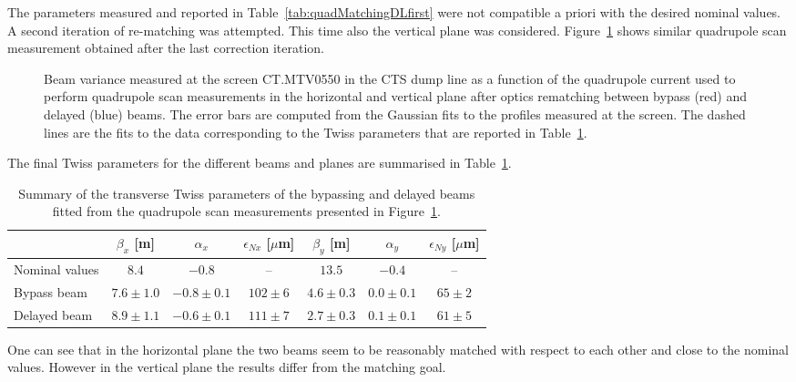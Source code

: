 The parameters measured and reported in Table~\ref{tab:quadMatchingDLfirst} were not compatible a
priori with the desired nominal values.
A second iteration of re-matching was attempted. This time also the vertical plane was considered.
Figure~\ref{fig:trasverseDLmatchingFinal} shows similar quadrupole scan measurement obtained after the
last correction iteration.
%
\begin{figure}[hbp]
\centering
{}
\qquad
{}
\caption{Beam variance measured at the screen CT.MTV0550 in the CTS dump line as a function of the
         quadrupole current used to perform quadrupole scan measurements 
         in the horizontal \protect{} and vertical
         \protect{} plane after optics rematching between bypass
         (red) and delayed (blue) beams.
         The error bars are computed from the Gaussian fits to the profiles measured at the screen.
         The dashed lines are the fits to the data corresponding to the Twiss parameters that are
         reported in Table~\ref{tab:quadMatchingDL}.
}
\label{fig:trasverseDLmatchingFinal}
\end{figure}
%
The final Twiss parameters for the different beams and planes are summarised in Table~\ref{tab:quadMatchingDL}.
%
\begin{table}[htbp]
\centering
\begin{tabular}{l c c c c c c}
\hline
              & $\beta_x$  [m]  &  $\alpha_x$     &  $\epsilon_{Nx}$   [$\mu$m]   & $\beta_y$  [m]  &  $\alpha_y$     &  $\epsilon_{Ny}$   [$\mu$m]    \\
\hline
Nominal values         & $8.4$       & $-0.8$       & --             & $13.5$       & $-0.4$       & -- \\
Bypass beam           & $7.6 \pm 1.0$   & $-0.8 \pm 0.1$   & $102 \pm 6$         & $4.6 \pm 0.3$  & $0.0 \pm 0.1$  &  $65 \pm 2$ \\
Delayed beam          & $8.9 \pm 1.1$   & $-0.6 \pm 0.1$   & $111 \pm 7$         & $2.7 \pm 0.3$  & $0.1 \pm 0.1$  &  $61 \pm 5$ \\
\hline 
\end{tabular}
\caption{Summary of the transverse Twiss parameters of the bypassing and delayed beams fitted from 
         the quadrupole scan measurements presented in Figure~\ref{fig:trasverseDLmatchingFinal}.}
\label{tab:quadMatchingDL}
\end{table}
%
One can see that in the horizontal plane the two beams seem to be reasonably matched with respect to
each other and close to the nominal values.
However in the vertical plane the results differ from the matching goal.

